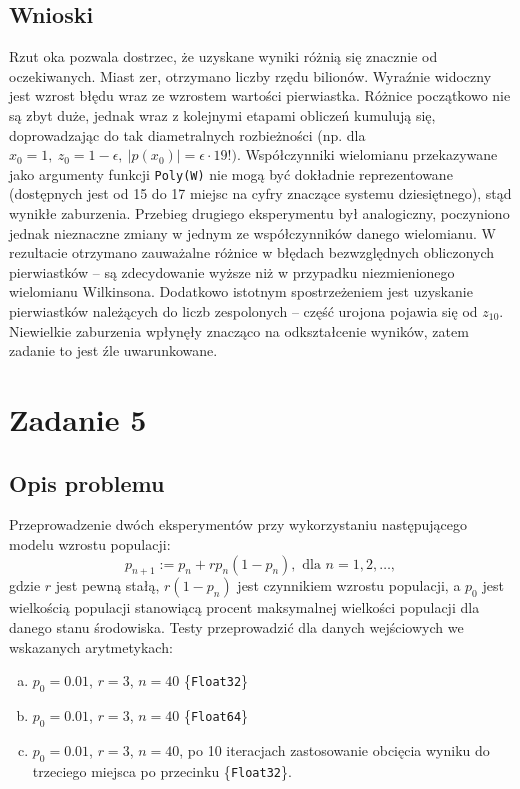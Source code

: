 \documentclass{classrep}
\begin{document}
	\subsection{Wnioski}
		Rzut oka pozwala dostrzec, że uzyskane wyniki różnią się znacznie od oczekiwanych. Miast zer, otrzymano liczby rzędu bilionów. Wyraźnie widoczny jest wzrost błędu wraz ze wzrostem wartości pierwiastka. Różnice początkowo nie są zbyt duże, jednak wraz z kolejnymi etapami obliczeń kumulują się, doprowadzając do tak diametralnych rozbieżności (np. dla $x_0 = 1, ~ z_0 = 1-\epsilon, ~|p(x_0)|=\epsilon \cdot 19!)$. Współczynniki wielomianu przekazywane jako argumenty funkcji \texttt{Poly(W)} nie mogą być dokładnie reprezentowane (dostępnych jest od 15 do 17 miejsc na cyfry znaczące systemu dziesiętnego), stąd wynikłe zaburzenia.
		Przebieg drugiego eksperymentu był analogiczny, poczyniono jednak nieznaczne zmiany w jednym ze współczynników danego wielomianu. W rezultacie otrzymano zauważalne różnice w błędach bezwzględnych obliczonych pierwiastków -- są zdecydowanie wyższe niż w przypadku niezmienionego wielomianu Wilkinsona. Dodatkowo istotnym spostrzeżeniem jest uzyskanie pierwiastków należących do liczb zespolonych -- część urojona pojawia się od $z_{10}$. Niewielkie zaburzenia wpłynęły znacząco na odkształcenie wyników, zatem zadanie to jest źle uwarunkowane.
\section{Zadanie 5}
	\subsection{Opis problemu}
		Przeprowadzenie dwóch eksperymentów przy wykorzystaniu następującego modelu wzrostu populacji: $$p_{n+1} := p_n + rp_n(1-p_n), \text{ dla } n = 1, 2, \dots,$$
		gdzie $r$ jest pewną stałą, $r(1-p_n)$ jest czynnikiem wzrostu populacji, a $p_0$ jest wielkością populacji stanowiącą procent maksymalnej wielkości populacji dla danego stanu środowiska.
		Testy przeprowadzić dla danych wejściowych we wskazanych arytmetykach:
		\begin{enumerate}[(a)]
			\item $p_0 = 0.01$, $r = 3$, $n = 40$ \{\texttt{Float32}\}
			\item $p_0 = 0.01$, $r = 3$, $n = 40$ \{\texttt{Float64}\}
			\item $p_0 = 0.01$, $r = 3$, $n = 40$, po 10 iteracjach zastosowanie obcięcia wyniku do trzeciego miejsca po przecinku \{\texttt{Float32}\}.
		\end{enumerate}
\end{document}
